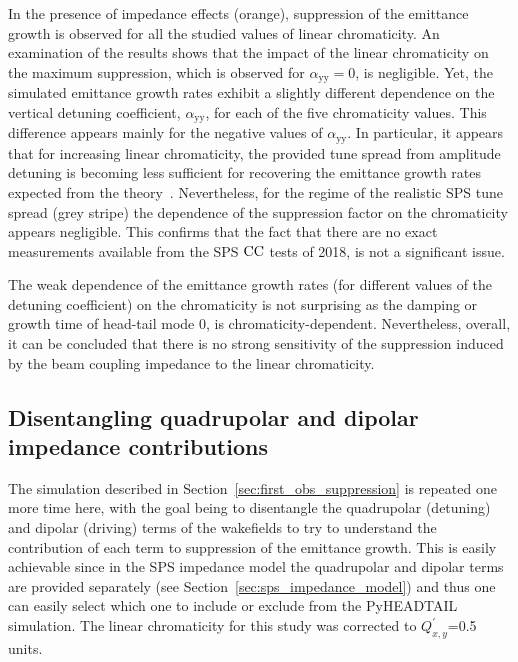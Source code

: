 In the presence of impedance effects (orange), suppression of the emittance growth is observed for all the studied values of linear chromaticity. An examination of the results shows that the impact of the linear chromaticity on the maximum suppression, which is observed for $\alpha_\mathrm{yy}=0$, is negligible. Yet, the simulated emittance growth rates exhibit a slightly different dependence on the vertical detuning coefficient, $\alpha_\mathrm{yy}$, for each of the five chromaticity values. This difference appears mainly for the negative values of $\alpha_\mathrm{yy}$. In particular, it appears that for increasing linear chromaticity, the provided tune spread from amplitude detuning is becoming less sufficient for recovering the emittance growth rates expected from the theory~\cite{PhysRevSTAB.18.101001}. Nevertheless, for the regime of the realistic SPS tune spread (grey stripe) the dependence of the suppression factor on the chromaticity appears negligible. This confirms that the fact that there are no exact measurements available from the SPS ${\mathrm{CC}}$ tests of 2018, is not a significant issue. 


The weak dependence of the emittance growth rates (for different values of the detuning coefficient) on the chromaticity is not surprising as the damping or growth time of head-tail mode 0, is chromaticity-dependent. Nevertheless, overall, it can be concluded that there is no strong sensitivity of the suppression induced by the beam coupling impedance to the linear chromaticity. 

\subsection{Disentangling quadrupolar and dipolar impedance contributions}\label{subsec:quad_vs_dipole}
The simulation described in Section~\ref{sec:first_obs_suppression} is repeated one more time here, with the goal being to disentangle the quadrupolar (detuning) and dipolar (driving) terms of the wakefields to try to understand the contribution of each term to suppression of the emittance growth. This is easily achievable since in the SPS impedance model the quadrupolar and dipolar terms are provided separately (see Section~\ref{sec:sps_impedance_model}) and thus one can easily select which one to include or exclude from the PyHEADTAIL simulation. The linear chromaticity for this study was corrected to $Q^\prime_{x,y}$=0.5 units.

